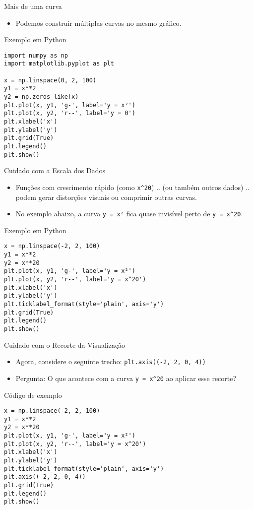 \begin{frame}[fragile]{Mais de uma curva}
    \begin{itemize}
        \item Podemos construir múltiplas curvas no mesmo gráfico.
    \end{itemize}

    \begin{block}{Exemplo em Python}
        \begin{verbatim}
import numpy as np
import matplotlib.pyplot as plt

x = np.linspace(0, 2, 100)
y1 = x**2
y2 = np.zeros_like(x)
plt.plot(x, y1, 'g-', label='y = x²')
plt.plot(x, y2, 'r--', label='y = 0')
plt.xlabel('x')
plt.ylabel('y')
plt.grid(True)
plt.legend()
plt.show()
\end{verbatim}
    \end{block}
\end{frame}

\begin{frame}[fragile]{Cuidado com a Escala dos Dados}
    \begin{itemize}
        \item Funções com crescimento rápido (como \texttt{x\^{}20}) .. (ou também outros dados) .. podem gerar distorções visuais ou comprimir outras curvas.
        \item No exemplo abaixo, a curva \texttt{y = x²} fica quase invisível perto de \texttt{y = x\^{}20}.
    \end{itemize}

    \begin{block}{Exemplo em Python}
        \begin{verbatim}
x = np.linspace(-2, 2, 100)
y1 = x**2
y2 = x**20
plt.plot(x, y1, 'g-', label='y = x²')
plt.plot(x, y2, 'r--', label='y = x^20')
plt.xlabel('x')
plt.ylabel('y')
plt.ticklabel_format(style='plain', axis='y')
plt.grid(True)
plt.legend()
plt.show()
\end{verbatim}
    \end{block}
\end{frame}

\begin{frame}[fragile]{Cuidado com o Recorte da Visualização}
    \begin{itemize}
        \item Agora, considere o seguinte trecho: \texttt{plt.axis((-2, 2, 0, 4))}

        \item \alert{Pergunta: O que acontece com a curva \texttt{y = x\^{}20} ao aplicar esse recorte?}
    \end{itemize}

    \begin{block}{Código de exemplo}
        \begin{verbatim}
x = np.linspace(-2, 2, 100)
y1 = x**2
y2 = x**20
plt.plot(x, y1, 'g-', label='y = x²')
plt.plot(x, y2, 'r--', label='y = x^20')
plt.xlabel('x')
plt.ylabel('y')
plt.ticklabel_format(style='plain', axis='y')
plt.axis((-2, 2, 0, 4))  
plt.grid(True)
plt.legend()
plt.show()
\end{verbatim}
    \end{block}
\end{frame}

